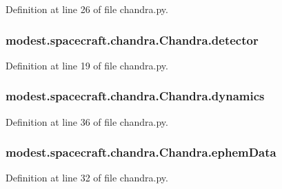 Definition at line 26 of file chandra.\+py.

\subsubsection[{\texorpdfstring{detector}{detector}}]{\setlength{\rightskip}{0pt plus 5cm}modest.\+spacecraft.\+chandra.\+Chandra.\+detector}\hypertarget{classmodest_1_1spacecraft_1_1chandra_1_1Chandra_aff4dd4f943d4b0dcafd9d2f894accbb4}{}\label{classmodest_1_1spacecraft_1_1chandra_1_1Chandra_aff4dd4f943d4b0dcafd9d2f894accbb4}


Definition at line 19 of file chandra.\+py.

\subsubsection[{\texorpdfstring{dynamics}{dynamics}}]{\setlength{\rightskip}{0pt plus 5cm}modest.\+spacecraft.\+chandra.\+Chandra.\+dynamics}\hypertarget{classmodest_1_1spacecraft_1_1chandra_1_1Chandra_a512fc9678fa06febebd872b6654f34a1}{}\label{classmodest_1_1spacecraft_1_1chandra_1_1Chandra_a512fc9678fa06febebd872b6654f34a1}


Definition at line 36 of file chandra.\+py.

\subsubsection[{\texorpdfstring{ephem\+Data}{ephemData}}]{\setlength{\rightskip}{0pt plus 5cm}modest.\+spacecraft.\+chandra.\+Chandra.\+ephem\+Data}\hypertarget{classmodest_1_1spacecraft_1_1chandra_1_1Chandra_a6157130227b1be71b55cc53b9b477fcd}{}\label{classmodest_1_1spacecraft_1_1chandra_1_1Chandra_a6157130227b1be71b55cc53b9b477fcd}


Definition at line 32 of file chandra.\+py.


